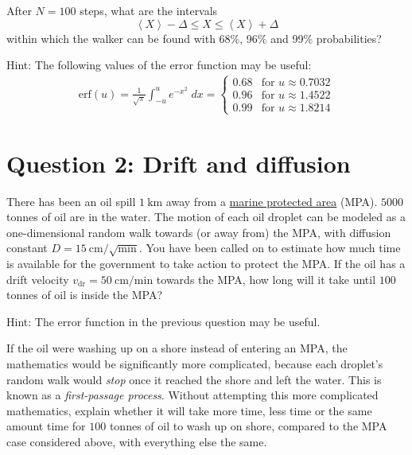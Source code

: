 \documentclass[12 pt]{article} %
\newcommand{\De}{\ensuremath{\Delta} }
\newcommand{\vdr}{\ensuremath{v_{\mathrm{dr}}} }
\newcommand{\vev}[1]{\ensuremath{\left\langle #1 \right\rangle} }
\newcommand{\showmarks}[1]{\rightline{\texttt{[#1 marks]}}} %
\begin{document}
\showmarks{3}

After $N = 100$ steps, what are the intervals
\begin{equation*}
  \vev{X} - \De \leq X \leq \vev{X} + \De
\end{equation*}
within which the walker can be found with 68\%, 96\% and 99\% probabilities?

Hint: The following values of the error function may be useful:
\begin{align*}
  \mathrm{erf}(u) = \frac{1}{\sqrt{\pi}} \int_{-u}^u e^{-x^2} \; dx = \left\{\begin{array}{ll}0.68 & \mbox{for } u \approx 0.7032 \\
                                                                                              0.96 & \mbox{for } u \approx 1.4522 \\
                                                                                              0.99 & \mbox{for } u \approx 1.8214\end{array}\right.
\end{align*}

\showmarks{6}



\section*{Question 2: Drift and diffusion}
There has been an oil spill $1~\mathrm{km}$ away from a \href{https://en.wikipedia.org/wiki/Marine_protected_area}{marine protected area} (MPA).
$5000$ tonnes of oil are in the water.
The motion of each oil droplet can be modeled as a one-dimensional random walk towards (or away from) the MPA, with diffusion constant $D = 15~\mathrm{cm}/\sqrt{\mathrm{min}}$.
You have been called on to estimate how much time is available for the government to take action to protect the MPA.
If the oil has a drift velocity $\vdr = 50~\mathrm{cm}/\mathrm{min}$ towards the MPA, how long will it take until $100$ tonnes of oil is inside the MPA?

Hint: The error function in the previous question may be useful.

\showmarks{12}

If the oil were washing up on a shore instead of entering an MPA, the mathematics would be significantly more complicated, because each droplet's random walk would \textit{stop} once it reached the shore and left the water.
This is known as a \textit{first-passage process}.
Without attempting this more complicated mathematics, explain whether it will take more time, less time or the same amount time for $100$ tonnes of oil to wash up on shore, compared to the MPA case considered above, with everything else the same.
\end{document}
